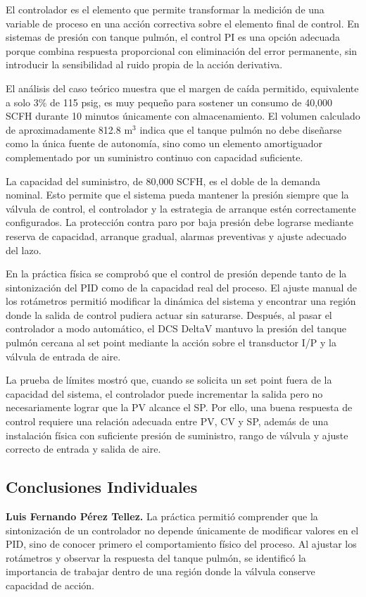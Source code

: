 \documentclass[12pt,letterpaper]{article}
\begin{document}
El controlador es el elemento que permite transformar la medición de una variable de proceso en una acción correctiva sobre el elemento final de control. En sistemas de presión con tanque pulmón, el control PI es una opción adecuada porque combina respuesta proporcional con eliminación del error permanente, sin introducir la sensibilidad al ruido propia de la acción derivativa.

El análisis del caso teórico muestra que el margen de caída permitido, equivalente a solo 3\% de 115 psig, es muy pequeño para sostener un consumo de 40,000 SCFH durante 10 minutos únicamente con almacenamiento. El volumen calculado de aproximadamente 812.8 m$^3$ indica que el tanque pulmón no debe diseñarse como la única fuente de autonomía, sino como un elemento amortiguador complementado por un suministro continuo con capacidad suficiente.

La capacidad del suministro, de 80,000 SCFH, es el doble de la demanda nominal. Esto permite que el sistema pueda mantener la presión siempre que la válvula de control, el controlador y la estrategia de arranque estén correctamente configurados. La protección contra paro por baja presión debe lograrse mediante reserva de capacidad, arranque gradual, alarmas preventivas y ajuste adecuado del lazo.

En la práctica física se comprobó que el control de presión depende tanto de la sintonización del PID como de la capacidad real del proceso. El ajuste manual de los rotámetros permitió modificar la dinámica del sistema y encontrar una región donde la salida de control pudiera actuar sin saturarse. Después, al pasar el controlador a modo automático, el DCS DeltaV mantuvo la presión del tanque pulmón cercana al set point mediante la acción sobre el transductor I/P y la válvula de entrada de aire.

La prueba de límites mostró que, cuando se solicita un set point fuera de la capacidad del sistema, el controlador puede incrementar la salida pero no necesariamente lograr que la PV alcance el SP. Por ello, una buena respuesta de control requiere una relación adecuada entre PV, CV y SP, además de una instalación física con suficiente presión de suministro, rango de válvula y ajuste correcto de entrada y salida de aire.

\subsection*{Conclusiones Individuales}

\textbf{Luis Fernando Pérez Tellez.} La práctica permitió comprender que la sintonización de un controlador no depende únicamente de modificar valores en el PID, sino de conocer primero el comportamiento físico del proceso. Al ajustar los rotámetros y observar la respuesta del tanque pulmón, se identificó la importancia de trabajar dentro de una región donde la válvula conserve capacidad de acción.
\end{document}
